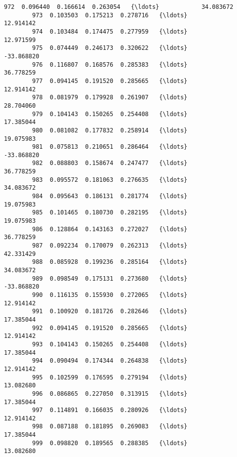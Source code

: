 \documentclass[11pt]{article}
\begin{document}
\begin{Verbatim}[commandchars=\\\{\}]
        972  0.096440  0.166614  0.263054   {\ldots}            34.083672   
        973  0.103503  0.175213  0.278716   {\ldots}            12.914142   
        974  0.103484  0.174475  0.277959   {\ldots}            12.971599   
        975  0.074449  0.246173  0.320622   {\ldots}           -33.868820   
        976  0.116807  0.168576  0.285383   {\ldots}            36.778259   
        977  0.094145  0.191520  0.285665   {\ldots}            12.914142   
        978  0.081979  0.179928  0.261907   {\ldots}            28.704060   
        979  0.104143  0.150265  0.254408   {\ldots}            17.385044   
        980  0.081082  0.177832  0.258914   {\ldots}            19.075983   
        981  0.075813  0.210651  0.286464   {\ldots}           -33.868820   
        982  0.088803  0.158674  0.247477   {\ldots}            36.778259   
        983  0.095572  0.181063  0.276635   {\ldots}            34.083672   
        984  0.095643  0.186131  0.281774   {\ldots}            19.075983   
        985  0.101465  0.180730  0.282195   {\ldots}            19.075983   
        986  0.128864  0.143163  0.272027   {\ldots}            36.778259   
        987  0.092234  0.170079  0.262313   {\ldots}            42.331429   
        988  0.085928  0.199236  0.285164   {\ldots}            34.083672   
        989  0.098549  0.175131  0.273680   {\ldots}           -33.868820   
        990  0.116135  0.155930  0.272065   {\ldots}            12.914142   
        991  0.100920  0.181726  0.282646   {\ldots}            17.385044   
        992  0.094145  0.191520  0.285665   {\ldots}            12.914142   
        993  0.104143  0.150265  0.254408   {\ldots}            17.385044   
        994  0.090494  0.174344  0.264838   {\ldots}            12.914142   
        995  0.102599  0.176595  0.279194   {\ldots}            13.082680   
        996  0.086865  0.227050  0.313915   {\ldots}            17.385044   
        997  0.114891  0.166035  0.280926   {\ldots}            12.914142   
        998  0.087188  0.181895  0.269083   {\ldots}            17.385044   
        999  0.098820  0.189565  0.288385   {\ldots}            13.082680   
        

\end{Verbatim}
\end{document}
